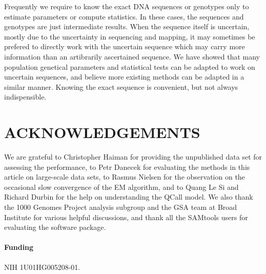 \documentclass{bioinfo}
\begin{document}
Frequently we require to know the exact DNA sequences or genotypes only to
estimate parameters or compute statistics. In these cases, the sequences and
genotypes are just intermediate results. When the sequence itself is uncertain,
mostly due to the uncertainty in sequencing and mapping, it may sometimes be
prefered to directly work with the uncertain sequence which may carry more
information than an artibrarily ascertained sequence. We have showed that many
population genetical parameters and statistical tests can be adapted to work on
uncertain sequences, and believe more existing methods can be adapted in a
similar manner. Knowing the exact sequence is convenient, but not always
indispensible.

\section*{ACKNOWLEDGEMENTS}
We are grateful to Christopher Haiman for providing the unpublished data set
for assessing the performance, to Petr Danecek for evaluating the methods in
this article on large-scale data sets, to Rasmus Nielsen for the observation on
the occasional slow convergence of the EM algorithm, and to Quang Le Si and
Richard Durbin for the help on understanding the QCall model.  We also thank
the 1000 Genomes Project analysis subgroup and the GSA team at Broad Institute
for various helpful discussions, and thank all the SAMtools users for
evaluating the software package.

\paragraph{Funding\textcolon} NIH 1U01HG005208-01.

\end{document}
